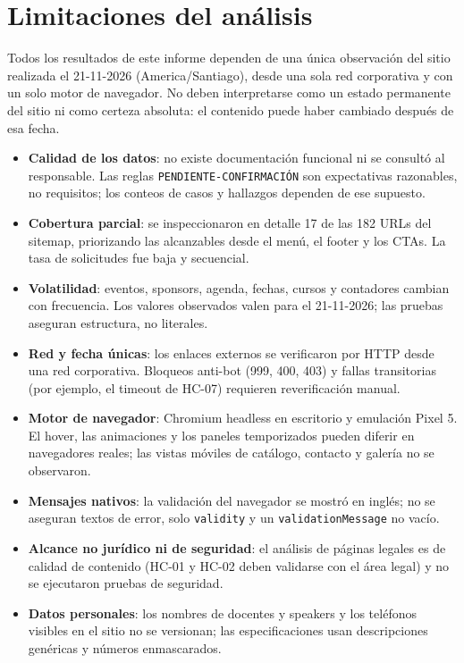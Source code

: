 \documentclass[11pt,a4paper]{article}
\newcommand{\code}[1]{\texttt{#1}}
\begin{document}
\section{Limitaciones del análisis}

\begin{warnbox}
Todos los resultados de este informe dependen de una única observación del sitio realizada
el \mbox{21-11-2026} (America/Santiago), desde una sola red corporativa y con un solo motor de
navegador. No deben interpretarse como un estado permanente del sitio ni como certeza
absoluta: el contenido puede haber cambiado después de esa fecha.
\end{warnbox}

\begin{itemize}
  \item \textbf{Calidad de los datos}: no existe documentación funcional ni se consultó al
    responsable. Las reglas \code{PENDIENTE-CONFIRMACIÓN} son expectativas razonables, no
    requisitos; los conteos de casos y hallazgos dependen de ese supuesto.
  \item \textbf{Cobertura parcial}: se inspeccionaron en detalle 17 de las 182 URLs del
    sitemap, priorizando las alcanzables desde el menú, el footer y los CTAs. La tasa de
    solicitudes fue baja y secuencial.
  \item \textbf{Volatilidad}: eventos, sponsors, agenda, fechas, cursos y contadores cambian
    con frecuencia. Los valores observados valen para el \mbox{21-11-2026}; las pruebas aseguran
    estructura, no literales.
  \item \textbf{Red y fecha únicas}: los enlaces externos se verificaron por HTTP desde una red
    corporativa. Bloqueos anti-bot (999, 400, 403) y fallas transitorias (por ejemplo, el
    timeout de \mbox{HC-07}) requieren reverificación manual.
  \item \textbf{Motor de navegador}: Chromium headless en escritorio y emulación Pixel 5. El
    hover, las animaciones y los paneles temporizados pueden diferir en navegadores reales;
    las vistas móviles de catálogo, contacto y galería no se observaron.
  \item \textbf{Mensajes nativos}: la validación del navegador se mostró en inglés; no se
    aseguran textos de error, solo \code{validity} y un \code{validationMessage} no vacío.
  \item \textbf{Alcance no jurídico ni de seguridad}: el análisis de páginas legales es de
    calidad de contenido (\mbox{HC-01} y \mbox{HC-02} deben validarse con el área legal) y no se
    ejecutaron pruebas de seguridad.
  \item \textbf{Datos personales}: los nombres de docentes y speakers y los teléfonos visibles
    en el sitio no se versionan; las especificaciones usan descripciones genéricas y
    números enmascarados.
\end{itemize}
\end{document}
